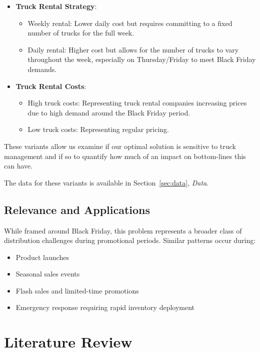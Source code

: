 \documentclass[a4paper,12pt]{article}
\begin{document}
\begin{itemize}
    \item \textbf{Truck Rental Strategy}:
    \begin{itemize}
        \item Weekly rental: Lower daily cost but requires committing to a fixed number of trucks for the full week.
        \item Daily rental: Higher cost but allows for the number of trucks to vary throughout the week, especially on Thursday/Friday to meet Black Friday demands.
    \end{itemize}

    \item \textbf{Truck Rental Costs}:
    \begin{itemize}
        \item High truck costs: Representing truck rental companies increasing prices due to high demand around the Black Friday period.
        \item Low truck costs: Representing regular pricing.
    \end{itemize}
\end{itemize}


These variants allow us examine if our optimal solution is sensitive to truck management and if so to quantify how much of an impact on bottom-lines this can have.

The data for these variants is available in Section~\ref{sec:data}, \textit{Data}.

\subsection{Relevance and Applications}\label{subsec:relevance-and-applications}

While framed around Black Friday, this problem represents a broader class of distribution challenges during promotional periods.
Similar patterns occur during:
\begin{itemize}
    \item Product launches
    \item Seasonal sales events
    \item Flash sales and limited-time promotions
    \item Emergency response requiring rapid inventory deployment
\end{itemize}




\section{Literature Review}\label{sec:literature-review}
\end{document}

